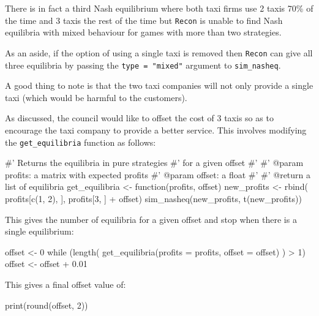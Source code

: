 There is in fact a third Nash equilibrium where both taxi firms use 2 taxis 70\%
of the time and 3 taxis the rest of the time but \texttt{Recon} is unable
to find Nash equilibria with mixed behaviour for games with more than two
strategies.

As an aside, if the option of using a single taxi is removed then
\texttt{Recon} can give all three equilibria by passing the
\texttt{type = "mixed"} argument to \texttt{sim_nasheq}.

A good thing to note is that the two taxi
companies will not only provide a single taxi (which would be harmful to the
customers).


As discussed, the council would like to offset the cost of 3
taxis so as to encourage the taxi company to provide a better service. This
involves modifying the \texttt{get_equilibria} function as follows:


\begin{Rin}
#' Returns the equilibria in pure strategies
#' for a given offset
#'
#' @param profits: a matrix with expected profits
#' @param offset: a float
#'
#' @return a list of equilibria
get_equilibria <- function(profits, offset){
    new_profits <- rbind(
                profits[c(1, 2), ],
                profits[3, ] + offset)
    sim_nasheq(new_profits, t(new_profits))
}
\end{Rin}


This gives the number of equilibria for a given offset and stop when there is a
single equilibrium:

\begin{Rin}
offset <- 0
while (length(
            get_equilibria(profits = profits, offset = offset)
            ) > 1){
    offset <- offset + 0.01
}
\end{Rin}

This gives a final offset value of:

\begin{Rin}
print(round(offset, 2))
\end{Rin}

